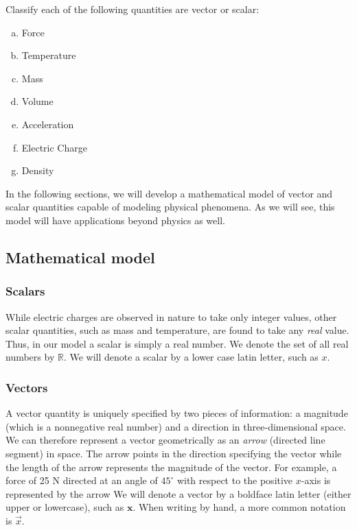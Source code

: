 \documentclass[12pt,letterpaper,reqno]{article}
\numberwithin{equation}{section}
\newcommand{\fixme}[1]{{\color{orange}{[#1]}}}
\begin{document}
\begin{exercise}
Classify each of the following quantities are vector or scalar:
\begin{enumerate}[(a)]
	\item Force
	\item Temperature
	\item Mass
	\item Volume
	\item Acceleration
	\item Electric Charge
	\item Density
\end{enumerate}	
\end{exercise}

In the following sections, we will develop a mathematical model of vector and scalar quantities capable of modeling physical phenomena. As we will see, this model will have applications beyond physics as well.

\subsection{Mathematical model}
\subsubsection{Scalars}\label{sec:scalars}
While electric charges are observed in nature to take only integer values, other scalar quantities, such as mass and temperature, are found to take any \emph{real} value. Thus, in our model a scalar is simply a real number. We denote the set of all real numbers by $\mathbb{R}$. We will denote a scalar by a lower case latin letter, such as $x$.

\subsubsection{Vectors}
A vector quantity is uniquely specified by two pieces of information: a magnitude (which is a nonnegative real number) and a direction in three-dimensional space. We can therefore represent a vector geometrically as an \emph{arrow} (directed line segment) in space.  The arrow points in the direction specifying the vector while the length of the arrow represents the magnitude of the vector. For example, a force of 25 N directed at an angle of $45^\circ$ with respect to the positive $x$-axis is represented by the arrow \fixme{Insert graphic.} We will denote a vector by a boldface latin letter (either upper or lowercase), such as $\mathbf{x}$. When writing by hand, a more common notation is $\vec{x}$.
\end{document}
